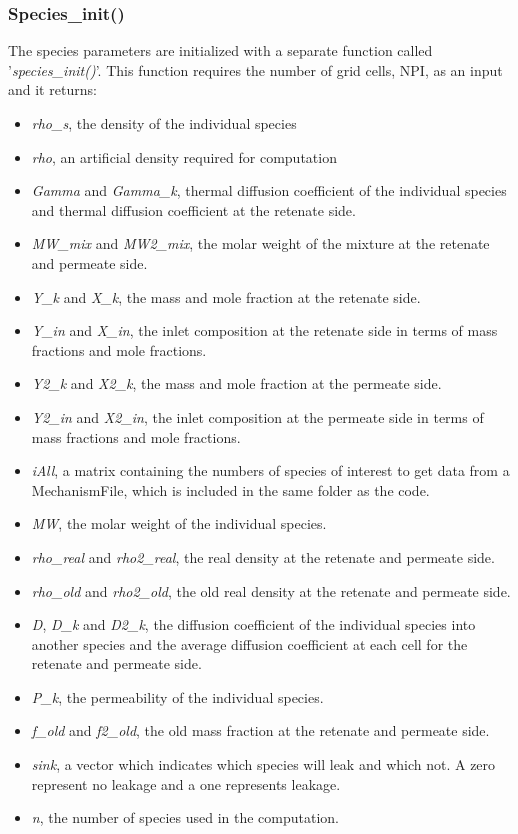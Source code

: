 \subsubsection{Species\_init()}
The species parameters are initialized with a separate function called '\textit{species\_init()}'. This function requires the number of grid cells, NPI, as an input and it returns:
\begin{itemize}
	\item \textit{rho\_s}, the density of the individual species 
	\item \textit{rho}, an artificial density required for computation
	\item \textit{Gamma} and \textit{Gamma\_k}, thermal diffusion coefficient of the individual species and thermal diffusion coefficient at the retenate side. 
	\item \textit{MW\_mix} and \textit{MW2\_mix}, the molar weight of the mixture at the retenate and permeate side. 
	\item \textit{Y\_k} and \textit{X\_k}, the mass and mole fraction at the retenate side.
	\item \textit{Y\_in} and \textit{X\_in}, the inlet composition at the retenate side in terms of mass fractions and mole fractions. 
	\item \textit{Y2\_k} and \textit{X2\_k}, the mass and mole fraction at the permeate side.
	\item \textit{Y2\_in} and \textit{X2\_in}, the inlet composition at the permeate side in terms of mass fractions and mole fractions. 
	\item \textit{iAll}, a matrix containing the numbers of species of interest to get data from a MechanismFile, which is included in the same folder as the code.  
	\item \textit{MW}, the molar weight of the individual species. 
	\item \textit{rho\_real} and \textit{rho2\_real}, the real density at the retenate and permeate side. 
	\item \textit{rho\_old} and \textit{rho2\_old}, the old real density at the retenate and permeate side. 	
	\item \textit{D}, \textit{D\_k} and \textit{D2\_k}, the diffusion coefficient of the individual species into another species and the average diffusion coefficient at each cell for the retenate and permeate side.
	\item \textit{P\_k}, the permeability of the individual species.
	\item \textit{f\_old} and \textit{f2\_old}, the old mass fraction at the retenate and permeate side. 	
	\item \textit{sink}, a vector which indicates which species will leak and which not. A zero represent no leakage and a one represents leakage.
	\item \textit{n}, the number of species used in the computation.
\end{itemize}
 
